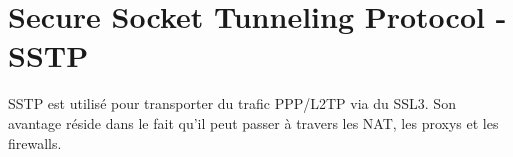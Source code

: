 \section{Secure Socket Tunneling Protocol - SSTP}
SSTP est utilisé pour transporter du trafic PPP/L2TP via du SSL3.
Son avantage réside dans le fait qu'il peut passer à travers les NAT, les proxys et les firewalls. 